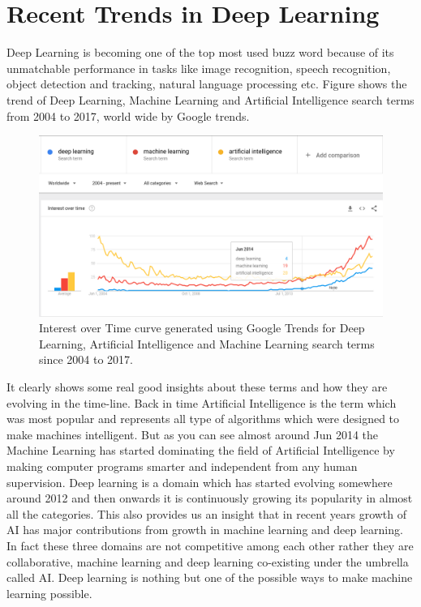 \documentclass[a4paper]{article}
\begin{document}
\section{Recent Trends in Deep Learning}
Deep Learning is becoming one of the top most used buzz word because of its unmatchable performance in tasks like image recognition, speech recognition, object detection and tracking, natural language processing etc. Figure shows the trend of Deep Learning, Machine Learning and Artificial Intelligence search terms from 2004 to 2017, world wide by Google trends. 

\begin{figure}[H]
\centering
\includegraphics[width=\linewidth]{images/Trend_ml_ai_dl.png}
\caption{Interest over Time curve generated using Google Trends for Deep Learning, Artificial Intelligence and Machine Learning search terms since 2004 to 2017.  
}
\label{fig:1.2}
\end{figure}

It clearly shows some real good insights about these terms and how they are evolving in the time-line. Back in time Artificial Intelligence is the term which was most popular and represents all type of algorithms which were designed to make machines intelligent. But as you can see almost around Jun 2014 the Machine Learning has started dominating the field of Artificial Intelligence by making computer programs smarter and independent from any human supervision. Deep learning is a domain which has started evolving somewhere around 2012 and then onwards it is continuously growing its popularity in almost all the categories. This also provides us an insight that in recent years growth of AI has major contributions from growth in machine learning and deep learning. In fact these three domains are not competitive among each other rather they are collaborative, machine learning and deep learning co-existing under the umbrella called AI. Deep learning is nothing but one of the possible ways to make machine learning possible.
\end{document}
